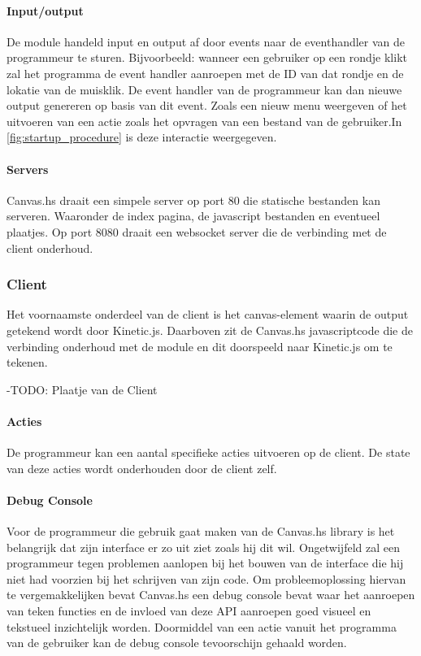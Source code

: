 \paragraph{Input/output}
De module handeld input en output af door events naar de eventhandler van de programmeur te sturen. Bijvoorbeeld: wanneer een gebruiker op een rondje klikt zal het programma de event handler aanroepen met de ID van dat rondje en de lokatie van de muisklik. De event handler van de programmeur kan dan nieuwe output genereren op basis van dit event. Zoals een nieuw menu weergeven of het uitvoeren van een actie zoals het opvragen van een bestand van de gebruiker.In \autoref{fig:startup_procedure} is deze interactie weergegeven. 

\paragraph{Servers}
Canvas.hs draait een simpele server op port 80 die statische bestanden kan serveren. Waaronder de index pagina, de javascript bestanden en eventueel plaatjes. Op port 8080 draait een websocket server die de verbinding met de client onderhoud.


\subsubsection{Client}
Het voornaamste onderdeel van de client is het canvas-element waarin de output getekend wordt door Kinetic.js. Daarboven zit de Canvas.hs javascriptcode die de verbinding onderhoud met de module en dit doorspeeld naar Kinetic.js om te tekenen.

-TODO: Plaatje van de Client


\paragraph{Acties}
De programmeur kan een aantal specifieke acties uitvoeren op de client. De state van deze acties wordt onderhouden door de client zelf. 



\paragraph{Debug Console}
Voor de programmeur die gebruik gaat maken van de Canvas.hs library is het belangrijk dat zijn interface er zo uit ziet zoals hij dit wil. Ongetwijfeld zal een programmeur tegen problemen aanlopen bij het bouwen van de interface die hij niet had voorzien bij het schrijven van zijn code. Om probleemoplossing hiervan te vergemakkelijken bevat Canvas.hs een debug console bevat waar het aanroepen van teken functies en de invloed van deze API aanroepen goed visueel en tekstueel inzichtelijk worden. Doormiddel van een actie vanuit het programma van de gebruiker kan de debug console tevoorschijn gehaald worden.
